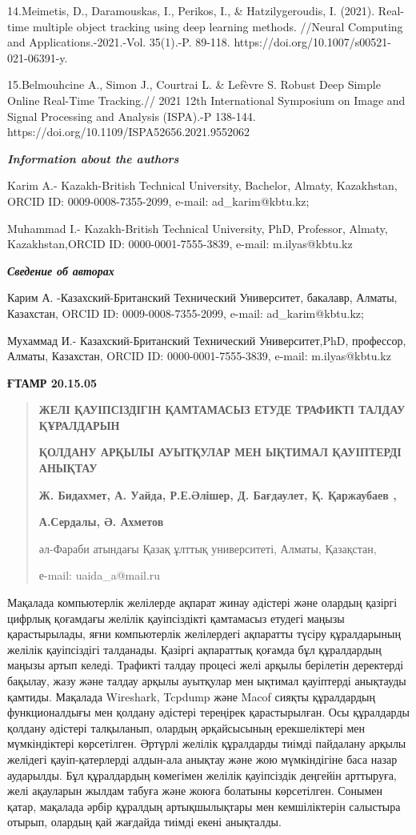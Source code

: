 14.Meimetis, D., Daramouskas, I., Perikos, I., \& Hatzilygeroudis, I.
(2021). Real-time multiple object tracking using deep learning methods.
//Neural Computing and Applications.-2021.-Vol. 35(1).-P. 89-118.
https://doi.org/10.1007/s00521-021-06391-y.

15.Belmouhcine A., Simon J., Courtrai L. \& Lefèvre S. Robust Deep
Simple Online Real-Time Tracking.// 2021 12th International Symposium on
Image and Signal Processing and Analysis (ISPA).-P 138-144.
https://doi.org/10.1109/ISPA52656.2021.9552062

\emph{\textbf{Information about the authors}}

Karim A.- Kazakh-British Technical University, Bachelor, Almaty,
Kazakhstan, ORCID ID: 0009-0008-7355-2099, e-mail: ad\_karim@kbtu.kz;

Muhammad I.- Kazakh-British Technical University, PhD, Professor,
Almaty, Kazakhstan,ORCID ID: 0000-0001-7555-3839, e-mail:
m.ilyas@kbtu.kz

\emph{\textbf{Сведение об авторах}}

Карим А. -Казахский-Британский Технический Университет, бакалавр,
Алматы, Казахстан, ORCID ID: 0009-0008-7355-2099, e-mail:
ad\_karim@kbtu.kz;

Мухаммад И.- Казахский-Британский Технический Университет,PhD,
профессор, Алматы, Казахстан, ORCID ID: 0000-0001-7555-3839, e-mail:
m.ilyas@kbtu.kz

\textbf{ҒТАМР 20.15.05}

\begin{quote}
\textbf{ЖЕЛІ ҚАУІПСІЗДІГІН ҚАМТАМАСЫЗ ЕТУДЕ ТРАФИКТІ ТАЛДАУ ҚҰРАЛДАРЫН}

\textbf{ҚОЛДАНУ АРҚЫЛЫ АУЫТҚУЛАР МЕН ЫҚТИМАЛ ҚАУІПТЕРДІ АНЫҚТАУ}

\textbf{Ж. Бидахмет, А. Уайда, Р.Е.Әлішер, Д. Бағдаулет, Қ. Қаржаубаев
,}

\textbf{А.Сердалы, Ә. Ахметов}

әл-Фараби атындағы Қазақ ұлттық университеті, Алматы, Қазақстан,

е-mail: uaida\_a@mail.ru
\end{quote}

Мақалада компьютерлік желілерде ақпарат жинау әдістері және олардың
қазіргі цифрлық қоғамдағы желілік қауіпсіздікті қамтамасыз етудегі
маңызы қарастырылады, яғни компьютерлік желілердегі ақпаратты түсіру
құралдарының желілік қауіпсіздігі талданады. Қазіргі ақпараттық қоғамда
бұл құралдардың маңызы артып келеді. Трафикті талдау процесі желі арқылы
берілетін деректерді бақылау, жазу және талдау арқылы ауытқулар мен
ықтимал қауіптерді анықтауды қамтиды. Мақалада Wireshark, Tcpdump және
Macof сияқты құралдардың функционалдығы мен қолдану әдістері тереңірек
қарастырылған. Осы құралдарды қолдану әдістері талқыланып, олардың
әрқайсысының ерекшеліктері мен мүмкіндіктері көрсетілген. Әртүрлі
желілік құралдарды тиімді пайдалану арқылы желідегі қауіп-қатерлерді
алдын-ала анықтау және жою мүмкіндігіне баса назар аударылды. Бұл
құралдардың көмегімен желілік қауіпсіздік деңгейін арттыруға, желі
ақауларын жылдам табуға және жоюға болатыны көрсетілген. Сонымен қатар,
мақалада әрбір құралдың артықшылықтары мен кемшіліктерін салыстыра
отырып, олардың қай жағдайда тиімді екені анықталды.

